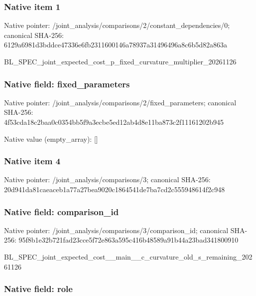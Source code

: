 \documentclass[10pt,a4paper]{article}
\begin{document}
\subsubsection{Native item 1}


Native pointer: /joint\_analysis/comparis\allowbreak{}ons/2/constant\_dependenc\allowbreak{}ies/0; canonical SHA-256: 6129a6981d3bddce47336e6f\allowbreak{}b2311600146a78937a314964\allowbreak{}96a8c6b5d82a863a


BL\_SPEC\_joint\_expected\_c\allowbreak{}ost\_p\_fixed\_curvature\_mu\allowbreak{}ltiplier\_20261126


\subsubsection{Native field: fixed\_parameters}


Native pointer: /joint\_analysis/comparis\allowbreak{}ons/2/fixed\_parameters; canonical SHA-256: 4f53cda18c2baa0c0354bb5f\allowbreak{}9a3ecbe5ed12ab4d8e11ba87\allowbreak{}3c2f11161202b945



Native value (empty\_array): []



\subsubsection{Native item 4}


Native pointer: /joint\_analysis/comparisons/3; canonical SHA-256: 20d941da81caeaceb1a77a27\allowbreak{}bea9020c1864541de7ba7cd2\allowbreak{}c555948614f2c948



\subsubsection{Native field: comparison\_id}


Native pointer: /joint\_analysis/comparis\allowbreak{}ons/3/comparison\_id; canonical SHA-256: 95f8b1e32b721fad23cce5f7\allowbreak{}2e863a595c416b48589a91b4\allowbreak{}4a23bad341800910


BL\_SPEC\_joint\_expected\_c\allowbreak{}ost\_\_main\_\_c\_curvature\_o\allowbreak{}ld\_s\_remaining\_20261126


\subsubsection{Native field: role}
\end{document}
